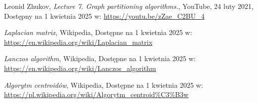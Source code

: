 \documentclass{article}
\begin{document}
    


\begin{thebibliography}{9}

Leonid Zhukov, \textit{Lecture 7. Graph partitioning algorithms.}, YouTube, 24 luty 2021, Dostępny na 1 kwietnia 2025 w: \url{https://youtu.be/zZae_C2BU_4}

\textit{Laplacian matrix}, Wikipedia, Dostępne na 1 kwietnia 2025 w: \url{https://en.wikipedia.org/wiki/Laplacian_matrix}

\textit{Lanczos algorithm}, Wikipedia, Dostępne na 1 kwietnia 2025 w:
\url{https://en.wikipedia.org/wiki/Lanczos_algorithm}

\textit{Algorytm centroidów}, Wikipedia, Dostępne na 1 kwietnia 2025 w:
\url{https://pl.wikipedia.org/wiki/Algorytm_centroid%C3%B3w}

\end{thebibliography}
\end{document}
